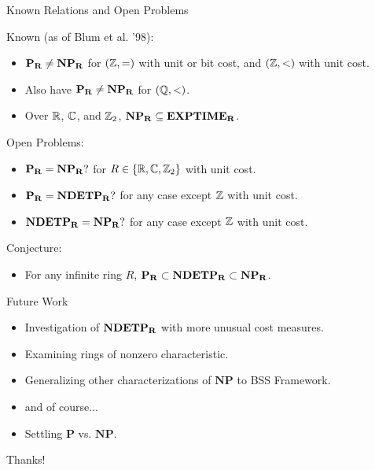 \documentclass[c]{beamer}
\begin{document}
\begin{frame}{Known Relations and Open Problems}

  Known (as of Blum et al. '98): 
  \begin{itemize}
  \item $\mathbf{P_R} \neq \mathbf{NP_R}$ for $(\mathbb{Z}, =)$ with unit or bit cost, and
    $(\mathbb{Z}, <)$ with unit cost.
  \item Also have $\mathbf{P_R} \neq \mathbf{NP_R}$ for $(\mathbb{Q}, <)$.
  \item Over $\mathbb{R}$, $\mathbb{C}$, and $\mathbb{Z}_2$, $\mathbf{NP_R} \subseteq
    \mathbf{EXPTIME_R}$.\pause
  \end{itemize}
  
  \vspace{\baselineskip}

  Open Problems:
  \begin{itemize}
  \item $\mathbf{P_R} = \mathbf{NP_R}?$ for $R \in \{\mathbb{R}, \mathbb{C}, \mathbb{Z}_2\}$
    with unit cost.
  \item $\mathbf{P_R} = \mathbf{NDETP_R}?$ for any case except $\mathbb{Z}$ with unit cost.
  \item $\mathbf{NDETP_R} = \mathbf{NP_R}?$ for any case except $\mathbb{Z}$ with unit cost.
  \end{itemize}\pause

  \vspace{\baselineskip}

  Conjecture:
  \begin{itemize}
    \item For any infinite ring $R$, $\mathbf{P_R} \subset \mathbf{NDETP_R} \subset \mathbf{NP_R}$.
  \end{itemize}
  
\end{frame}

\begin{frame}{Future Work}
  
  \begin{itemize}
  \item Investigation of $\mathbf{NDETP_R}$ with more unusual cost measures. \pause
  \item Examining rings of nonzero characteristic. \pause
  \item Generalizing other characterizations of $\mathbf{NP}$ to BSS
    Framework. \pause
  \item[] and of course... 
  \item Settling $\mathbf{P}$ vs. $\mathbf{NP}$.
  \end{itemize}
\end{frame}

\begin{frame}

  Thanks!

\end{frame}
\end{document}
